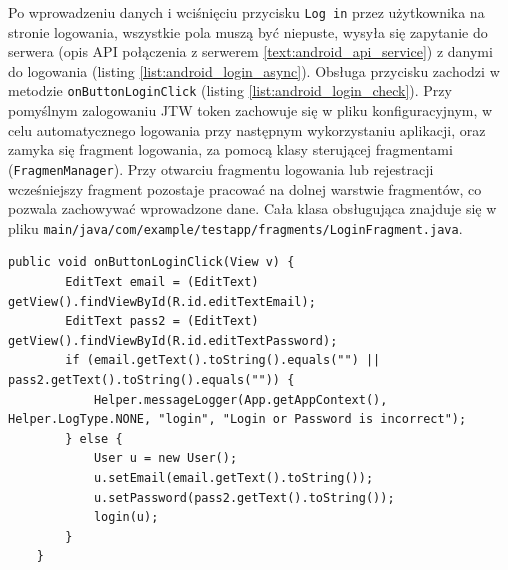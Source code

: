 Po \label{text:login} wprowadzeniu danych i wciśnięciu przycisku \texttt{Log in} przez użytkownika na stronie logowania, wszystkie pola muszą być niepuste, wysyła się zapytanie do serwera (opis API połączenia z serwerem \ref{text:android_api_service}) z danymi do logowania (listing \ref{list:android_login_async}). Obsługa przycisku zachodzi w metodzie \texttt{onButtonLoginClick} (listing \ref{list:android_login_check}).
Przy pomyślnym zalogowaniu JTW token zachowuje się w pliku konfiguracyjnym, w celu automatycznego logowania przy następnym wykorzystaniu aplikacji, oraz zamyka się fragment logowania, za pomocą klasy sterującej fragmentami (\texttt{FragmenManager}). Przy otwarciu fragmentu logowania lub rejestracji wcześniejszy fragment pozostaje pracować na dolnej warstwie fragmentów, co pozwala zachowywać wprowadzone dane.
Cała klasa obsługująca znajduje się w pliku \texttt{main/java/com/example/testapp/fragments/LoginFragment.java}.
\begin{lstlisting}[label=list:android_login_check,caption=Obsługa przycisku login,basicstyle=\tiny\ttfamily]
    public void onButtonLoginClick(View v) {
        EditText email = (EditText) getView().findViewById(R.id.editTextEmail);
        EditText pass2 = (EditText) getView().findViewById(R.id.editTextPassword);
        if (email.getText().toString().equals("") || pass2.getText().toString().equals("")) {
            Helper.messageLogger(App.getAppContext(), Helper.LogType.NONE, "login", "Login or Password is incorrect");
        } else {
            User u = new User();
            u.setEmail(email.getText().toString());
            u.setPassword(pass2.getText().toString());
            login(u);
        }
    }
\end{lstlisting}
